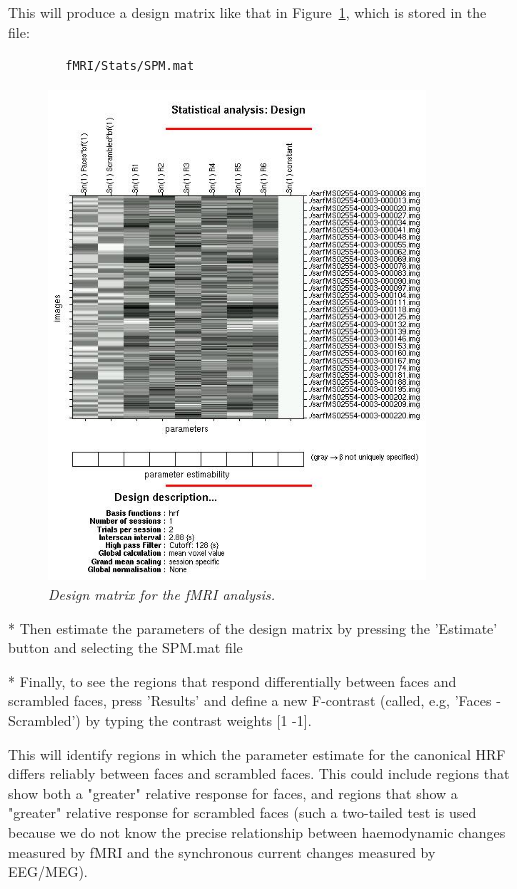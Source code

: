 This will produce a design matrix like that in Figure~\ref{fig_32_21}, which is stored in the file:
\begin{verbatim}
        fMRI/Stats/SPM.mat
\end{verbatim}

\begin{figure}
\begin{center}
\includegraphics[width=100mm]{multimodal/figures/figure_32_21}
\caption{\em Design matrix for the fMRI analysis. \label{fig_32_21}}
\end{center}
\end{figure}

* Then estimate the parameters of the design matrix by pressing the 'Estimate' button and selecting the SPM.mat file

* Finally, to see the regions that respond differentially between faces and scrambled faces, press 'Results' and define a new F-contrast (called, e.g, 'Faces - Scrambled') by typing the contrast weights [1 -1].

This will identify regions in which the parameter estimate for the canonical HRF differs reliably between faces and scrambled faces. This could include regions that show both a "greater" relative response for faces, and regions that show a "greater" relative response for scrambled faces (such a two-tailed test is used because we do not know the precise relationship between haemodynamic changes measured by fMRI and the synchronous current changes measured by EEG/MEG).

